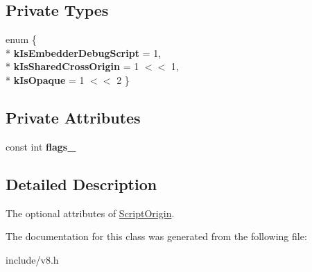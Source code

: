 \subsection*{Private Types}
\begin{DoxyCompactItemize}
\item 
enum \{ \\*
{\bfseries k\+Is\+Embedder\+Debug\+Script} = 1, 
\\*
{\bfseries k\+Is\+Shared\+Cross\+Origin} = 1 $<$$<$ 1, 
\\*
{\bfseries k\+Is\+Opaque} = 1 $<$$<$ 2
 \}\hypertarget{classv8_1_1_script_origin_options_a78e493d360bd11b748318dc40656ad1e}{}\label{classv8_1_1_script_origin_options_a78e493d360bd11b748318dc40656ad1e}

\end{DoxyCompactItemize}
\subsection*{Private Attributes}
\begin{DoxyCompactItemize}
\item 
const int {\bfseries flags\+\_\+}\hypertarget{classv8_1_1_script_origin_options_aa35317c743b5c38dcb92cc7cd7563791}{}\label{classv8_1_1_script_origin_options_aa35317c743b5c38dcb92cc7cd7563791}

\end{DoxyCompactItemize}


\subsection{Detailed Description}
The optional attributes of \hyperlink{classv8_1_1_script_origin}{Script\+Origin}. 

The documentation for this class was generated from the following file\+:\begin{DoxyCompactItemize}
\item 
include/v8.\+h\end{DoxyCompactItemize}
